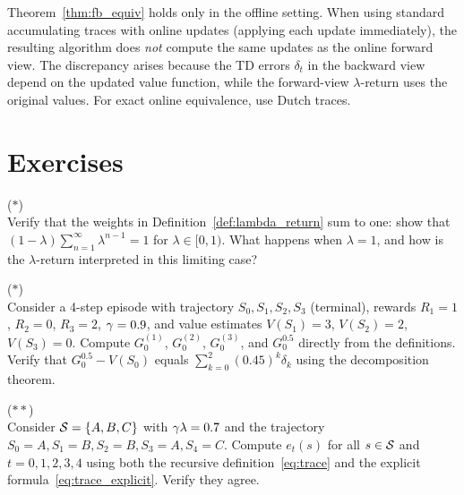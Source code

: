 \documentclass[11pt,a4paper]{article}
\begin{document}
\begin{warning}[title={Accumulating Traces Break Online Equivalence}]
Theorem~\ref{thm:fb_equiv} holds only in the offline setting.
When using standard accumulating traces with online updates (applying
each update immediately), the resulting algorithm does \emph{not}
compute the same updates as the online forward view. The discrepancy
arises because the TD errors $\delta_t$ in the backward view depend on
the updated value function, while the forward-view $\lambda$-return
uses the original values. For exact online equivalence, use Dutch
traces.
\end{warning}

\section{Exercises}
\label{sec:exercises}

\begin{exercise}
\textnormal{(\(*\))} \\
Verify that the weights in Definition~\ref{def:lambda_return} sum to
one: show that $(1 - \lambda)\sum_{n=1}^\infty \lambda^{n-1} = 1$ for
$\lambda \in [0,1)$. What happens when $\lambda = 1$, and how is the
$\lambda$-return interpreted in this limiting case?
\end{exercise}

\begin{exercise}[$\lambda$-Return for $\lambda = 0.5$]
\textnormal{(\(*\))} \\
Consider a 4-step episode with trajectory
$S_0, S_1, S_2, S_3$ (terminal), rewards $R_1 = 1$, $R_2 = 0$,
$R_3 = 2$, $\gamma = 0.9$, and value estimates $V(S_1) = 3$,
$V(S_2) = 2$, $V(S_3) = 0$. Compute $G_0^{(1)}$, $G_0^{(2)}$,
$G_0^{(3)}$, and $G_0^{0.5}$ directly from the definitions. Verify
that $G_0^{0.5} - V(S_0)$ equals
$\sum_{k=0}^{2} (0.45)^k \delta_k$ using the decomposition theorem.
\end{exercise}

\begin{exercise}
\textnormal{(\(**\))} \\
Consider $\mathcal{S} = \{A, B, C\}$ with $\gamma\lambda = 0.7$ and
the trajectory $S_0 = A, S_1 = B, S_2 = B, S_3 = A, S_4 = C$.
Compute $e_t(s)$ for all $s \in \mathcal{S}$ and $t = 0, 1, 2, 3, 4$
using both the recursive definition~\eqref{eq:trace} and the explicit
formula~\eqref{eq:trace_explicit}. Verify they agree.
\end{exercise}
\end{document}
